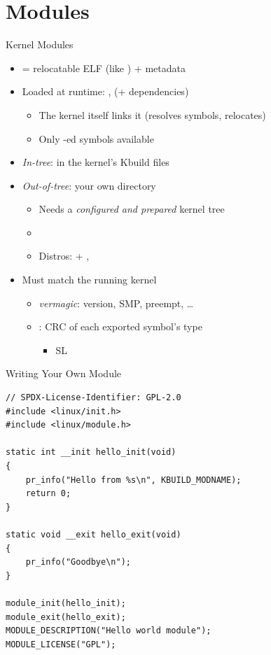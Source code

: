 
\section{Modules}
\frame{\sectionpage}

\begin{frame}{Kernel Modules}

  \begin{itemize}[<+->]
    \item {} = relocatable ELF (like ) + metadata
    \item Loaded at runtime: ,  (+ dependencies)
      \begin{itemize}
	\item The kernel itself links it (resolves symbols, relocates)
	\item Only -ed symbols available
      \end{itemize}
    \item \emph{In-tree}:  in the kernel's Kbuild files
    \item \emph{Out-of-tree}: your own directory
      \begin{itemize}
	\item Needs a \emph{configured and prepared} kernel tree
	\item {}
	\item Distros:  + , 
      \end{itemize}
    \item Must match the running kernel
      \begin{itemize}
	\item \emph{vermagic}: version, SMP, preempt, \dots
	\item {}: CRC of each exported symbol's type
	  \begin{itemize}
	    \item SL
	  \end{itemize}
      \end{itemize}
  \end{itemize}

\end{frame}

\begin{frame}[fragile]{Writing Your Own Module}{}

  \begin{lstlisting}[basicstyle=\scriptsize\ttfamily]
// SPDX-License-Identifier: GPL-2.0
#include <linux/init.h>
#include <linux/module.h>

static int __init hello_init(void)
{
	pr_info("Hello from %s\n", KBUILD_MODNAME);
	return 0;
}

static void __exit hello_exit(void)
{
	pr_info("Goodbye\n");
}

module_init(hello_init);
module_exit(hello_exit);
MODULE_DESCRIPTION("Hello world module");
MODULE_LICENSE("GPL");
  \end{lstlisting}

\end{frame}

